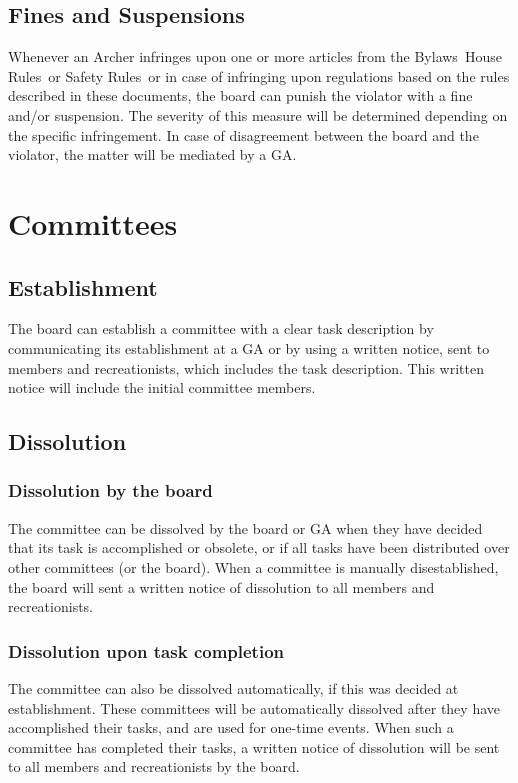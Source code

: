 \documentclass[a4paper]{article}
\newcommand{\Asta}{Bylaws} %
\newcommand{\Ahr}{House Rules} %
\newcommand{\Asr}{Safety Rules} %
\begin{document}
\subsection{Fines and Suspensions}
Whenever an Archer infringes upon one or more articles from the \Asta\, \Ahr\ or \Asr\, or in case of infringing upon regulations based on the rules described in these documents, the board can punish the violator with a fine and/or suspension. The severity of this measure will be determined depending on the specific infringement. In case of disagreement between the board and the violator, the matter will be mediated by a GA.

\section{Committees}
\subsection{Establishment}
The board can establish a committee with a clear task description by communicating its establishment at a GA or by using a written notice, sent to members and recreationists, which includes the task description. This written notice will include the initial committee members.

\subsection{Dissolution}
\subsubsection{Dissolution by the board}
The committee can be dissolved by the board or GA when they have decided that its task is accomplished or obsolete, or if all tasks have been distributed over other committees (or the board). When a committee is manually disestablished, the board will sent a written notice of dissolution to all members and recreationists.

\subsubsection{Dissolution upon task completion}
The committee can also be dissolved automatically, if this was decided at establishment. These committees will be automatically dissolved after they have accomplished their tasks, and are used for one-time events. When such a committee has completed their tasks, a written notice of dissolution will be sent to all members and recreationists by the board.
\end{document}
